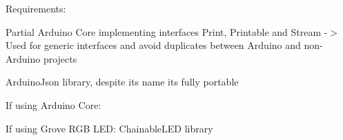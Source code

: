Requirements\+:
\begin{DoxyItemize}
\item Partial Arduino Core implementing interfaces Print, Printable and Stream -\/$>$ Used for generic interfaces and avoid duplicates between Arduino and non-\/\+Arduino projects
\item Arduino\+Json library, despite it\textquotesingle{}s name it\textquotesingle{}s fully portable
\item If using Arduino Core\+:
\begin{DoxyItemize}
\item If using Grove R\+GB L\+ED\+: Chainable\+L\+ED library 
\end{DoxyItemize}
\end{DoxyItemize}